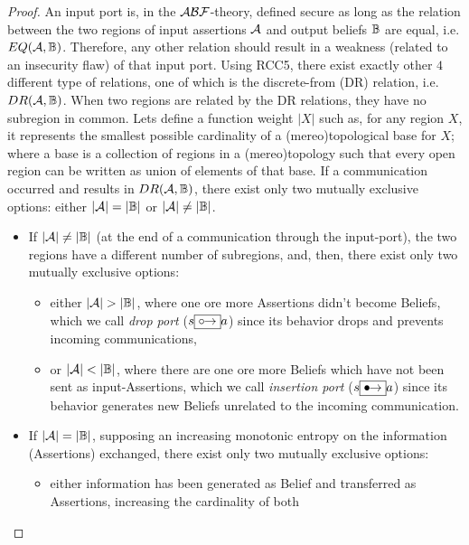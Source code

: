\begin{proof}
An input port is, in the $\mathcal{A}\mathcal{B}\mathcal{F}$-theory, defined secure as long as the relation
	between the two regions of input assertions $\mathcal{A}$ and
	output beliefs $\mathbb{B}$ are equal, i.e.
	$EQ(\mathcal{A},\mathbb{B})$. Therefore, any other relation
	should result in a weakness (related to an insecurity flaw) of that
	input port.  Using RCC5, there exist exactly other $4$ different type
	of relations, one of which is the discrete-from (DR) relation, i.e.
	$DR(\mathcal{A},\mathbb{B})$. When two regions are related by
	the DR relations, they have no subregion in common. Lets
	define a function weight $|X|$ such as, for any region $X$, it
	represents the smallest possible cardinality of a (mereo)topological base for
	$X$; where a base is a collection of regions in a (mereo)topology such that
	every open region can be written as union of elements of that base.  If
	a communication occurred and results in
	$DR(\mathcal{A},\mathbb{B})$, there exist only two mutually
	exclusive options: either $|\mathcal{A}|=|\mathbb{B}|$ or
	$|\mathcal{A}|\neq|\mathbb{B}|$. 
	\begin{itemize}
		\item If $|\mathcal{A}|\neq|\mathbb{B}|$ (at the end of
			a communication through the input-port), the two
			regions have a different number of subregions, and,
			then, there exist only two mutually exclusive options: 
			\begin{itemize}
				\item either $|\assertionRegion|>|\beliefRegion|$, where one
					ore more Assertions didn't become Beliefs, which we
					call \emph{drop port} ($s\fbox{\ensuremath {\mathrel{\circ\!\!\rightarrow}}} a$) since its behavior drops and
					prevents incoming communications,
				\item or $|\assertionRegion|<|\beliefRegion|$, where there are
					one ore more Beliefs which have not been sent as
					input-Assertions, which we call \emph{insertion
					port} ($s\fbox{\ensuremath {\mathrel{\bullet\!\!\rightarrow}}} a$) since its behavior generates new Beliefs
					unrelated to the incoming communication. 
			\end{itemize}
		\item If $|\mathcal{A}|=|\mathbb{B}|$, supposing an increasing monotonic entropy on the information (Assertions) exchanged, 
				there exist only two mutually exclusive options: 
			\begin{itemize}
				\item either information has been generated as Belief and transferred as Assertions, increasing the cardinality of both

\end{itemize}
\end{itemize}
\end{proof}

